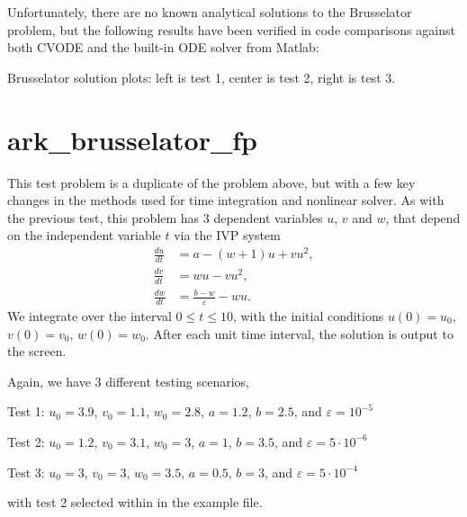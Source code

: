 \documentclass[letterpaper,10pt,english]{sphinxmanual}
\begin{document}
Unfortunately, there are no known analytical solutions to the
Brusselator problem, but the following results have been verified
in code comparisons against both CVODE and the built-in ODE solver
 from Matlab:

\noindent{}

\noindent{}

\noindent{}

Brusselator solution plots: left is test 1, center is test 2, right is
test 3.


\section{ark\_brusselator\_fp}
\label{\detokenize{c_serial:ark-brusselator-fp}}\label{\detokenize{c_serial:id8}}
This test problem is a duplicate of the  problem
above, but with a few key changes in the methods used for time
integration and nonlinear solver.  As with the previous test, this
problem has 3 dependent variables \(u\), \(v\) and \(w\),
that depend on the independent variable \(t\) via the IVP system
\begin{equation*}
\begin{split}\frac{du}{dt} &= a - (w+1)u + v u^2, \\
\frac{dv}{dt} &= w u - v u^2, \\
\frac{dw}{dt} &= \frac{b-w}{\varepsilon} - w u.\end{split}
\end{equation*}
We integrate over the interval \(0 \le t \le 10\), with the
initial conditions \(u(0) = u_0\), \(v(0) = v_0\),
\(w(0) = w_0\).  After each unit time interval, the solution is
output to the screen.

Again, we have 3 different testing scenarios,

Test 1:  \(u_0=3.9\),  \(v_0=1.1\),  \(w_0=2.8\),
\(a=1.2\), \(b=2.5\), and \(\varepsilon=10^{-5}\)

Test 2:  \(u_0=1.2\), \(v_0=3.1\), \(w_0=3\), \(a=1\),
\(b=3.5\), and \(\varepsilon=5\cdot10^{-6}\)

Test 3:  \(u_0=3\), \(v_0=3\), \(w_0=3.5\), \(a=0.5\),
\(b=3\), and \(\varepsilon=5\cdot10^{-4}\)

with test 2 selected within in the example file.
\end{document}
